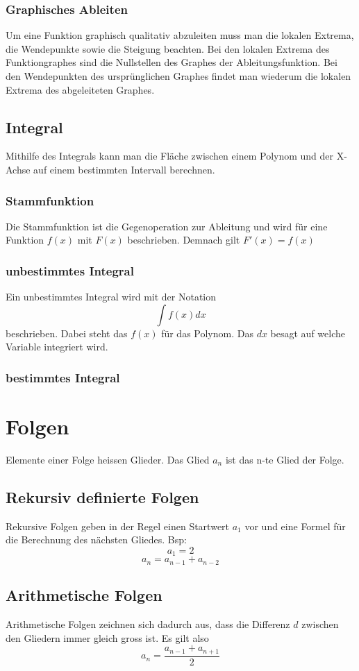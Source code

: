 \documentclass{article}
\begin{document}
\subsubsection{Graphisches Ableiten}
Um eine Funktion graphisch qualitativ abzuleiten muss man die lokalen Extrema, die Wendepunkte sowie die Steigung beachten. Bei den lokalen Extrema des Funktiongraphes sind die Nullstellen des Graphes der Ableitungsfunktion. Bei den Wendepunkten des ursprünglichen Graphes findet man wiederum die lokalen Extrema des abgeleiteten Graphes.
\subsection{Integral}
Mithilfe des Integrals kann man die Fläche zwischen einem Polynom und der X-Achse auf einem bestimmten Intervall berechnen.
\subsubsection{Stammfunktion}
Die Stammfunktion ist die Gegenoperation zur Ableitung und wird für eine Funktion \(f(x)\) mit \(F(x)\) beschrieben. Demnach gilt \(F'(x) = f(x)\)
\subsubsection{unbestimmtes Integral}
Ein unbestimmtes Integral wird mit der Notation
\[
		\int f(x)dx
\]
beschrieben. Dabei steht das \(f(x)\) für das Polynom. Das \(dx\) besagt auf welche Variable integriert wird.
\subsubsection{bestimmtes Integral}
\section{Folgen}
Elemente einer Folge heissen Glieder. Das Glied \(a_n\) ist das n-te Glied der Folge.
\subsection{Rekursiv definierte Folgen}
Rekursive Folgen geben in der Regel einen Startwert \(a_1\) vor und eine Formel für die Berechnung des nächsten Gliedes. Bsp: \[
a_1 = 2
\] \[
		a_n = a_{n-1} + a_{n-2}
\]
\subsection{Arithmetische Folgen}
Arithmetische Folgen zeichnen sich dadurch aus, dass die Differenz \(d\) zwischen den Gliedern immer gleich gross ist. Es gilt also \[
		a_n = \frac{a_{n-1} + a_{n+1}}{2} 
\]
\end{document}
